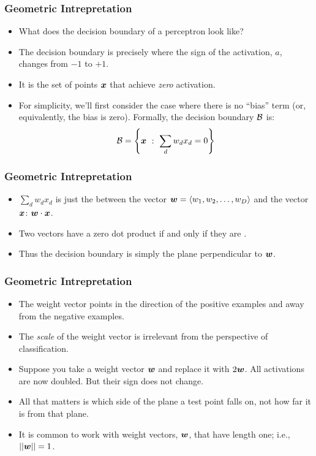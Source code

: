 \documentclass[trans]{beamer}
\begin{document}
\begin{frame}
  \frametitle{Geometric Intrepretation}
\begin{itemize}
\item
What does the
decision boundary of a perceptron look like?  
\item The decision boundary
is precisely where the sign of the activation, $a$, changes from $-1$
to $+1$.  
\item It is the set of points ${\boldsymbol{x}}$ that achieve
\emph{zero} activation.
\item
  For simplicity, we'll first consider the case where there
is no ``bias'' term (or, equivalently, the bias is zero).  Formally,
the decision boundary $\mathcal{B}$ is:
\begin{equation}
\mathcal{B} = \left\{ {\boldsymbol{x}} ~:~ \sum_d w_d x_d = 0 \right\}
\end{equation}
\end{itemize}
\end{frame}
\begin{frame}
  \frametitle{Geometric Intrepretation}
\begin{itemize}
\item
$\sum_d w_d x_d$ is
just the  between the vector ${\boldsymbol{w}} = \langle w_1,
w_2, \dots, w_D \rangle$ and the vector ${\boldsymbol{x}}$: 
${\boldsymbol{w}} \cdot {\boldsymbol{x}}$.  
\item  Two vectors have a zero dot product if and only if
they are .  
\item Thus the decision boundary is simply the plane
perpendicular to ${\boldsymbol{w}}$.
\end{itemize}
\end{frame}

\begin{frame}
  \frametitle{Geometric Intrepretation}
\begin{itemize}
\item
 The weight vector points in the direction of the positive examples
and away from the negative examples.
\item The \emph{scale} of the weight vector is
irrelevant from the perspective of classification. 
\item Suppose you take a
weight vector ${\boldsymbol{w}}$ and replace it with $2 {\boldsymbol{w}}$.  All activations are
now doubled.  But their sign does not change. 
\item All that matters is which side of the plane
a test point falls on, not how far it is from that plane. 
\item It is common to work with 
weight vectors, ${\boldsymbol{w}}$, that have length one; i.e., $\left\vert\left\vert {\boldsymbol{w}} \right\vert\right\vert = 1$.

\end{itemize}
\end{frame}
\end{document}
